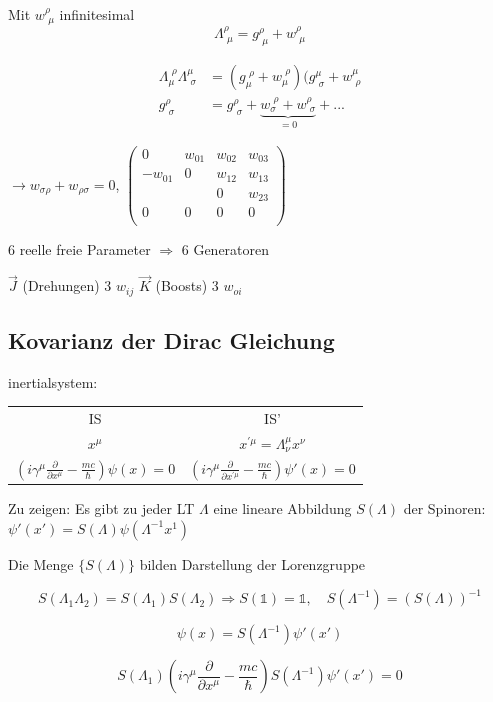 Mit \(w^\rho_{\,\,\mu}\) infinitesimal
\[\Lambda^\rho_{\,\,\mu} = g^\rho_{\,\,\mu}+w^\rho_{\,\,\mu} \]

\begin{align}
\Lambda^{\,\,\rho}_{\mu}\Lambda^\mu_{\,\,\sigma}  &= (g_\mu^{\,\,\rho}+w_\mu^{\,\,\rho})(g^\mu_{\,\,\sigma}+w^\mu_{\,\,\rho} \\
g^\rho_{\,\,\sigma} &= g^\rho_{\,\,\sigma}+\underbrace{w_\sigma^{\,\,\rho}+w^\rho_{\,\,\sigma}}_{=0}+...
\end{align}

\(\rightarrow w_{\sigma\rho}+w_{\rho\sigma}=0\), \( \begin{pmatrix}0&w_{01}&w_{02}&w_{03}\\ -w_{01}&0&w_{12}&w_{13}\\ &&0&w_{23}\\ 0&0&0&0\\ \end{pmatrix} \)

6 reelle freie Parameter  \(\Rightarrow \) 6 Generatoren

\(\vec J\) (Drehungen) 3 \(w_{ij}\)
\(\vec K\) (Boosts) 3 \(w_{oi}\)


\subsection{Kovarianz der Dirac Gleichung}

inertialsystem:

\begin{tabular}{cc}
  IS&IS'\\
\(x^\mu\)& \(x^{'\mu}=\Lambda^\mu_\nu x^\nu\)\\
\((i\gamma^\mu\frac{\partial}{\partial x^\mu}-\frac{mc}{\hbar})\psi(x) = 0\)&\((i\gamma^\mu\frac{\partial}{\partial x^{'\mu}}-\frac{mc}{\hbar})\psi'(x) = 0\)
\end{tabular}

Zu zeigen: Es gibt zu jeder LT \(\Lambda\) eine lineare Abbildung \(S(\Lambda)\) der Spinoren: \(\psi'(x')=S(\Lambda)\psi(\Lambda^{-1}x^1)\)

Die Menge \(\{S(\Lambda)\}\) bilden Darstellung der Lorenzgruppe

\[S(\Lambda_1\Lambda_2) = S(\Lambda_1)S(\Lambda_2) \Rightarrow S(\mathbb 1) = \mathbb 1, \quad S(\Lambda^{-1})=(S(\Lambda))^{-1}\]

\[\psi(x) = S(\Lambda^{-1})\psi'(x') \]



\[S(\Lambda_1)  (i\gamma^\mu\frac{\partial}{\partial x^\mu}-\frac{mc}{\hbar})S(\Lambda^{-1}) \psi'(x') = 0\]

